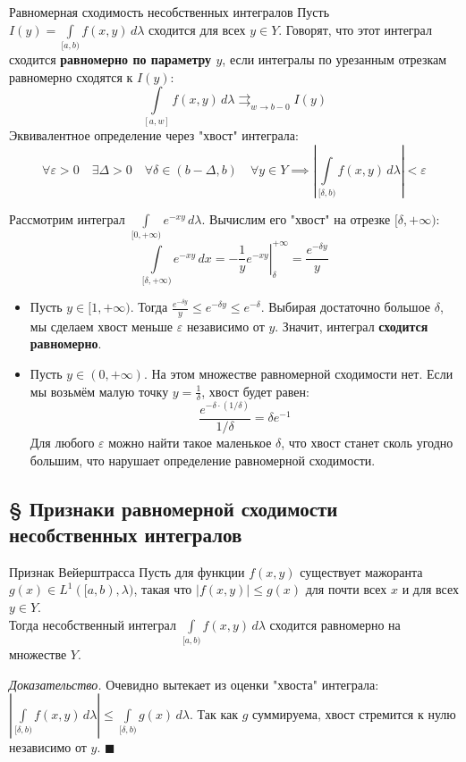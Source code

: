 \documentclass[12pt,a4paper]{article}
\newenvironment{Proof}[1][Доказательство]{\vspace{0.5em}\noindent\textit{#1.}\hspace{0.5em}\ignorespaces}{\hfill$\blacksquare$\vspace{1em}}
\begin{document}
\begin{Definition}{Равномерная сходимость несобственных интегралов}{}
Пусть $I(y) = \int\limits_{[a, b)} f(x, y) \, d\lambda$ сходится для всех $y \in Y$. Говорят, что этот интеграл сходится \textbf{равномерно по параметру $y$}, если интегралы по урезанным отрезкам равномерно сходятся к $I(y)$:
$$ \int\limits_{[a, w]} f(x, y) \, d\lambda \rightrightarrows_{w \to b-0} I(y) $$
Эквивалентное определение через "хвост" интеграла:
$$ \forall \varepsilon > 0 \quad \exists \Delta > 0 \quad \forall \delta \in (b-\Delta, b) \quad \forall y \in Y \implies \left| \int\limits_{[\delta, b)} f(x,y) \, d\lambda \right| < \varepsilon $$
\end{Definition}

\begin{Example}
Рассмотрим интеграл $\int\limits_{[0, +\infty)} e^{-xy} \, d\lambda$.
Вычислим его "хвост" на отрезке $[\delta, +\infty)$:
$$ \int\limits_{[\delta, +\infty)} e^{-xy} \, dx = \left. -\frac{1}{y} e^{-xy} \right|_{\delta}^{+\infty} = \frac{e^{-\delta y}}{y} $$
\begin{itemize}
    \item Пусть $y \in [1, +\infty)$. Тогда $\frac{e^{-\delta y}}{y} \le e^{-\delta y} \le e^{-\delta}$. Выбирая достаточно большое $\delta$, мы сделаем хвост меньше $\varepsilon$ независимо от $y$. Значит, интеграл \textbf{сходится равномерно}.
    \item Пусть $y \in (0, +\infty)$. На этом множестве равномерной сходимости нет. Если мы возьмём малую точку $y = \frac{1}{\delta}$, хвост будет равен:
    $$ \frac{e^{-\delta \cdot (1/\delta)}}{1/\delta} = \delta e^{-1} $$
    Для любого $\varepsilon$ можно найти такое маленькое $\delta$, что хвост станет сколь угодно большим, что нарушает определение равномерной сходимости.
\end{itemize}
\end{Example}



\subsection{§ Признаки равномерной сходимости несобственных интегралов}

\begin{Theorem}{Признак Вейерштрасса}{}
Пусть для функции $f(x,y)$ существует мажоранта $g(x) \in L^1([a,b), \lambda)$, такая что $|f(x,y)| \le g(x)$ для почти всех $x$ и для всех $y \in Y$. \\
Тогда несобственный интеграл $\int\limits_{[a,b)} f(x,y) \, d\lambda$ сходится равномерно на множестве $Y$.
\end{Theorem}
\begin{Proof}
Очевидно вытекает из оценки "хвоста" интеграла: $\left| \int\limits_{[\delta, b)} f(x,y) \, d\lambda \right| \le \int\limits_{[\delta, b)} g(x) \, d\lambda$. Так как $g$ суммируема, хвост стремится к нулю независимо от $y$.
\end{Proof}
\end{document}
